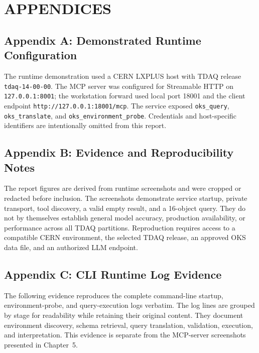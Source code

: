 \documentclass[12pt, a4paper]{report}
\begin{document}
\chapter*{APPENDICES}
\section*{Appendix A: Demonstrated Runtime Configuration}
The runtime demonstration used a CERN LXPLUS host with TDAQ release
\texttt{tdaq-14-00-00}. The MCP server was configured for Streamable HTTP on
\texttt{127.0.0.1:8001}; the workstation forward used local port 18001 and
the client endpoint \texttt{http://127.0.0.1:18001/mcp}. The service exposed
\texttt{oks\_query}, \texttt{oks\_translate}, and
\texttt{oks\_environment\_probe}. Credentials and host-specific identifiers
are intentionally omitted from this report.

\section*{Appendix B: Evidence and Reproducibility Notes}
The report figures are derived from runtime screenshots and were cropped or
redacted before inclusion. The screenshots demonstrate service startup, private
transport, tool discovery, a valid empty result, and a 16-object query. They
do not by themselves establish general model accuracy, production availability,
or performance across all TDAQ partitions. Reproduction requires access to a
compatible CERN environment, the selected TDAQ release, an approved OKS data
file, and an authorized LLM endpoint.

\clearpage
\section*{Appendix C: CLI Runtime Log Evidence}
The following evidence reproduces the complete command-line startup,
environment-probe, and query-execution logs verbatim. The log lines are grouped
by stage for readability while retaining their original content. They document
environment discovery, schema retrieval, query translation, validation,
execution, and interpretation. This evidence is separate from the MCP-server
screenshots presented in Chapter~5.
\end{document}

